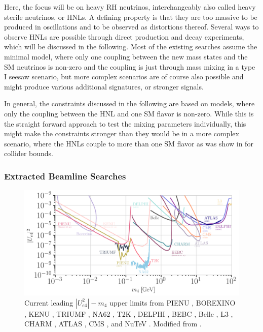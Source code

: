 Here, the focus will be on heavy RH neutrinos, interchangeably also called heavy sterile neutrinos, or HNLs. A defining property is that they are too massive to be produced in oscillations and to be observed as distortions thereof. Several ways to observe HNLs are possible through direct production and decay experiments, which will be discussed in the following. Most of the existing searches assume the minimal model, where only one coupling between the new mass states and the SM neutrinos is non-zero and the coupling is just through mass mixing in a type I seesaw scenario, but more complex scenarios are of course also possible and might produce various additional signatures, or stronger signals.

In general, the constraints discussed in the following are based on models, where only the coupling between the HNL and one SM flavor is non-zero. While this is the straight forward approach to test the mixing parameters individually, this might make the constraints stronger than they would be in a more complex scenario, where the HNLs couple to more than one SM flavor as was show in  for collider bounds.


\subsubsection{Extracted Beamline Searches}

\begin{figure}[h]
    \includegraphics{figures/hnl_simulation/theory/UeN_majorana.png}
      \caption[Current leading $|U_{e4}^2|-m_4$ upper limits]{Current leading $|U_{e4}^2|-m_4$ upper limits from PIENU \cite{pienu_Bryman:2019bjg, PIENU:2017wbj}, BOREXINO \cite{Borexino:2013bot}, KENU \cite{pienu_Bryman:2019bjg}, TRIUMF \cite{triumf_ue4_Britton1992ImprovedSF}, NA62 \cite{NA62:2022pyf}, T2K \cite{T2K:2019jwa}, DELPHI \cite{DELPHI:1996qcc}, BEBC \cite{Barouki:2022bkt}, Belle \cite{Belle:2013ytx}, L3 \cite{L3:2001zfe}, CHARM \cite{CHARM:1983ayi}, ATLAS \cite{ATLAS:2019kpx, atlas_2022_HNL_PhysRevLett.131.061803}, CMS \cite{CMS:2018iaf, CMS:2022fut}, and NuTeV \cite{NuTeV:1999kej}. Modified from \cite{hoster_limitFernandez-Martinez:2023phj}.}
\end{figure}

